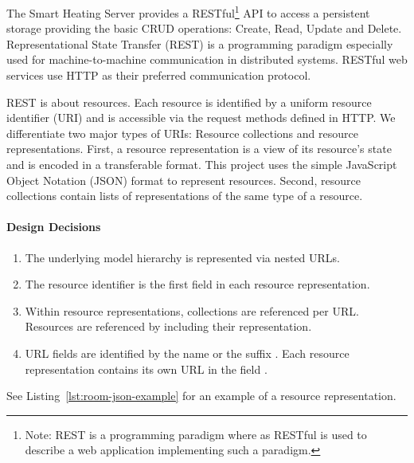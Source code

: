 The Smart Heating Server provides a RESTful\footnote{Note: REST is a programming paradigm where as RESTful is used to describe a web application implementing such a paradigm.} API to access a persistent storage providing the basic CRUD operations: Create, Read, Update and Delete.
Representational State Transfer (REST) is a programming paradigm especially used for machine-to-machine communication in distributed systems.
RESTful web services use HTTP as their preferred communication protocol.

REST is about resources.
Each resource is identified by a uniform resource identifier (URI) and is accessible via the request methods defined in HTTP.
We differentiate two major types of URIs: Resource collections and resource representations.
First, a resource representation is a view of its resource's state and is encoded in a transferable format.
This project uses the simple JavaScript Object Notation (JSON) format to represent resources.
Second, resource collections contain lists of representations of the same type of a resource.

\paragraph{Design Decisions}

\begin{enumerate}
    \itemsep0em
    \item The underlying model hierarchy is represented via nested URLs.
    \label{enum:design_decision_nested_urls}
    
    \item The resource identifier is the first field in each resource representation.
    \label{enum:design_decision_identifier_first_field}
    
    \item Within resource representations, collections are referenced per URL. Resources are referenced by including their representation.
    \label{enum:design_decision_resource_referencing}
    
    \item URL fields are identified by the name  or the suffix . Each resource representation contains its own URL in the field .
    \label{enum:design_decision_url_fields_prefix}
\end{enumerate}

See Listing~\ref{lst:room-json-example} for an example of a resource representation.

